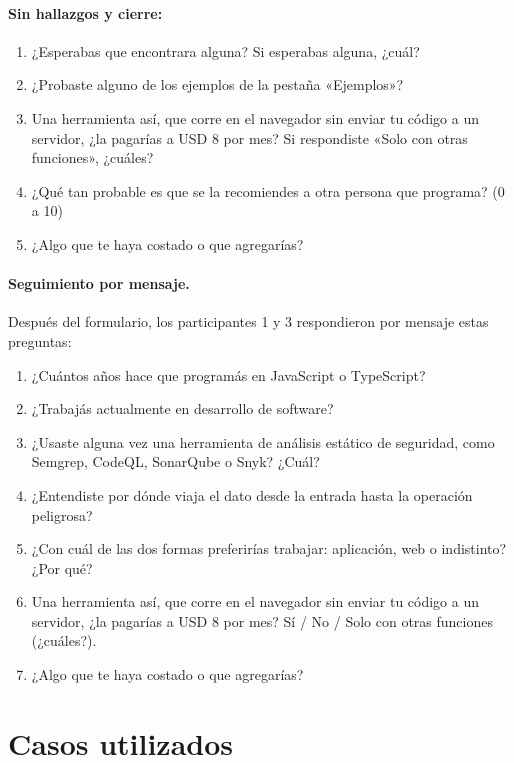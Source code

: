 \paragraph{Sin hallazgos y cierre:}
\begin{enumerate}[resume]
    \item ¿Esperabas que encontrara alguna? Si esperabas alguna, ¿cuál?
    \item ¿Probaste alguno de los ejemplos de la pestaña «Ejemplos»?
    \item Una herramienta así, que corre en el navegador sin enviar tu
          código a un servidor, ¿la pagarías a USD 8 por mes? Si
          respondiste «Solo con otras funciones», ¿cuáles?
    \item ¿Qué tan probable es que se la recomiendes a otra persona que
          programa? (0 a 10)
    \item ¿Algo que te haya costado o que agregarías?
\end{enumerate}

\paragraph{Seguimiento por mensaje.} Después del formulario, los
participantes 1 y 3 respondieron por mensaje estas preguntas:
\begin{enumerate}
    \item ¿Cuántos años hace que programás en JavaScript o TypeScript?
    \item ¿Trabajás actualmente en desarrollo de software?
    \item ¿Usaste alguna vez una herramienta de análisis estático de
          seguridad, como Semgrep, CodeQL, SonarQube o Snyk? ¿Cuál?
    \item ¿Entendiste por dónde viaja el dato desde la entrada hasta la
          operación peligrosa?
    \item ¿Con cuál de las dos formas preferirías trabajar: aplicación,
          web o indistinto? ¿Por qué?
    \item Una herramienta así, que corre en el navegador sin enviar tu
          código a un servidor, ¿la pagarías a USD 8 por mes? Sí / No /
          Solo con otras funciones (¿cuáles?).
    \item ¿Algo que te haya costado o que agregarías?
\end{enumerate}

\section{Casos utilizados}

